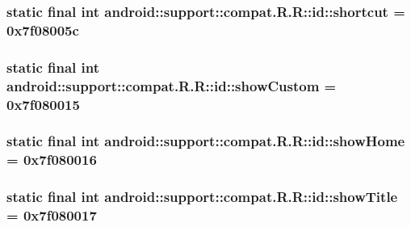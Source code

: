 \hypertarget{classandroid_1_1support_1_1compat_1_1_r_1_1id_6e0f958fbd041ff34a564c4040b9656b}{
\subsubsection[{shortcut}]{\setlength{\rightskip}{0pt plus 5cm}static final int android::support::compat.R.R::id::shortcut = 0x7f08005c}}
\label{classandroid_1_1support_1_1compat_1_1_r_1_1id_6e0f958fbd041ff34a564c4040b9656b}


\hypertarget{classandroid_1_1support_1_1compat_1_1_r_1_1id_740708c8db9abf447735c36c9e1fcc82}{
\subsubsection[{showCustom}]{\setlength{\rightskip}{0pt plus 5cm}static final int android::support::compat.R.R::id::showCustom = 0x7f080015}}
\label{classandroid_1_1support_1_1compat_1_1_r_1_1id_740708c8db9abf447735c36c9e1fcc82}


\hypertarget{classandroid_1_1support_1_1compat_1_1_r_1_1id_4cd25d00bab47ae50811a0dae8961cba}{
\subsubsection[{showHome}]{\setlength{\rightskip}{0pt plus 5cm}static final int android::support::compat.R.R::id::showHome = 0x7f080016}}
\label{classandroid_1_1support_1_1compat_1_1_r_1_1id_4cd25d00bab47ae50811a0dae8961cba}


\hypertarget{classandroid_1_1support_1_1compat_1_1_r_1_1id_fdc33521ec0d656699304b4919f51674}{
\subsubsection[{showTitle}]{\setlength{\rightskip}{0pt plus 5cm}static final int android::support::compat.R.R::id::showTitle = 0x7f080017}}
\label{classandroid_1_1support_1_1compat_1_1_r_1_1id_fdc33521ec0d656699304b4919f51674}


